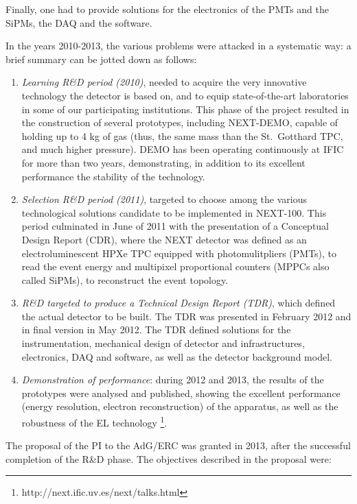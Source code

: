 Finally, one had to provide solutions for the electronics of the PMTs and the SiPMs, the  DAQ and the software.

In the years 2010-2013, the various problems were attacked in a systematic way: a brief summary can be jotted down as follows:

\begin{enumerate}
\item {\em Learning R\&D period (2010)}, needed to acquire the very innovative technology the detector is based on, and to equip state-of-the-art laboratories in some of our participating institutions. This phase of the project resulted in the construction of several prototypes, including NEXT-DEMO, capable of holding up to 4 kg of gas (thus, the same mass than  the St.~Gotthard TPC, and much higher pressure). DEMO has been operating continuously at IFIC for more than two years, demonstrating, in addition to its excellent performance the stability of the technology.  

\item {\em Selection R\&D period (2011)}, targeted to choose among the various technological solutions candidate to be implemented in NEXT-100. This period culminated in June of 2011 with the presentation of a Conceptual Design Report (CDR), where the NEXT detector was defined as an electroluminescent HPXe TPC equipped with photomulitpliers (PMTs),  to read the event energy and multipixel proportional counters (MPPCs also called SiPMs), to reconstruct the event topology. 

\item {\em R\&D targeted to produce a Technical Design Report (TDR)}, which defined the actual detector to be built. The TDR was presented in February 2012 and in final version in May 2012. The TDR defined solutions for the instrumentation, mechanical design of detector and infrastructures, electronics, DAQ and software, as well as the detector background model. 

\item {\em Demonstration of performance}: during 2012 and 2013, the results of the prototypes were analysed and published, showing the excellent performance (energy resolution, electron reconstruction) of the apparatus, as well as the robustness of the EL technology \footnote{http://next.ific.uv.es/next/talks.html}.  
\end{enumerate}

The proposal of the PI to the AdG/ERC was granted in 2013, after the successful completion of the R\&D phase. The objectives described in the proposal were:

